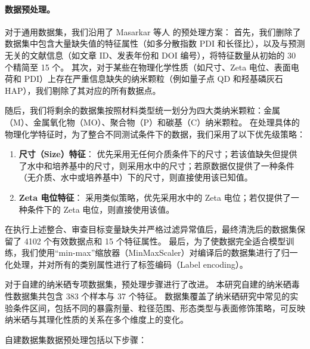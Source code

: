 \documentclass[letterpaper]{article}
\begin{document}
\paragraph{数据预处理。}
对于通用数据集，我们沿用了 Masarkar 等人 \cite{masarkar2024} 的预处理方案：
首先，我们删除了数据集中包含大量缺失值的特征属性（如多分散指数 PDI 和长径比），以及与预测无关的文献信息（如文章 ID、发表年份和 DOI 编号），将特征数量从初始的 30 个精简至 15 个。
其次，对于某些在物理化学性质（如尺寸、Zeta 电位、表面电荷和 PDI）上存在严重信息缺失的纳米颗粒（例如量子点 QD 和羟基磷灰石 HAP），我们剔除了其对应的所有数据点。

随后，我们将剩余的数据集按照材料类型统一划分为四大类纳米颗粒：金属（M）、金属氧化物（MO）、聚合物（P）和碳基（C）纳米颗粒。
在处理具体的物理化学特征时，为了整合不同测试条件下的数据，我们采用了以下优先级策略：

\begin{enumerate}
  \item \textbf{尺寸（Size）特征}：
优先采用无任何介质条件下的尺寸；若该值缺失但提供了水中和培养基中的尺寸，则采用水中的尺寸；若原数据仅提供了一种条件（无介质、水中或培养基中）下的尺寸，则直接使用该已知值。

  \item \textbf{Zeta 电位特征}：
采用类似策略，优先采用水中的 Zeta 电位；若仅提供了一种条件下的 Zeta 电位，则直接使用该值。
\end{enumerate}

在执行上述整合、审查目标变量缺失并严格过滤异常值后，最终清洗后的数据集保留了 4102 个有效数据点和 15 个特征属性。
最后，为了使数据完全适合模型训练，我们使用“min-max”缩放器（MinMaxScaler）对编译后的数据集进行了归一化处理，并对所有的类别属性进行了标签编码（Label encoding）。

对于自建的纳米硒专项数据集，预处理步骤进行了改进。
本研究自建的纳米硒毒性数据集共包含 383 个样本与 37 个特征。
数据集覆盖了纳米硒研究中常见的实验条件区间，包括不同的暴露剂量、粒径范围、形态类型与表面修饰策略，可反映纳米硒与其理化性质的关系在多个维度上的变化。

自建数据集数据预处理包括以下步骤：
\end{document}
